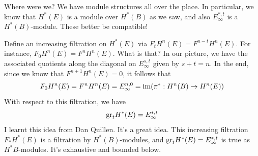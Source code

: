 Where were we?
We have module structures all over the place.
In particular, we know that $H^\ast(E)$ is a module over $H^\ast(B)$ as we saw, and also $E^{\ast,t}_\infty$ is a $H^\ast(B)$-module.
These better be compatible!

Define an increasing filtration on $H^\ast(E)$ via $F_t H^n(E) = F^{n-t} H^n(E)$.
For instance, $F_0 H^n(E) = F^n H^n(E)$.
What is that?
In our picture, we have the associated quotients along the diagonal on $E^{s,t}_\infty$ given by $s+t = n$.
In the end, since we know that $F^{n+1} H^n(E) = 0$, it follows that
$$F_0 H^n(E) = F^n H^n(E) = E^{n,0}_\infty = \operatorname{im}(\pi^\ast:H^n(B)\to H^n(E))$$
With respect to this filtration, we have
$$
\mathrm{gr}_t H^\ast(E) = E^{\ast,t}_\infty
$$
I learnt this idea from Dan Quillen.
It's a great idea.
This increasing filtration $F_\ast H^\ast(E)$ is a filtration by $H^\ast(B)$-modules, and $\mathrm{gr}_t H^\ast(E) = E^{\ast,t}_\infty$ is true as $H^\ast B$-modules.
It's exhaustive and bounded below.

